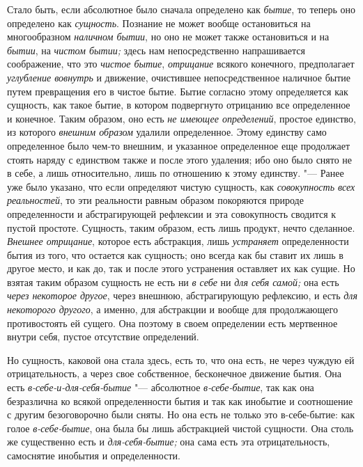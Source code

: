 Стало быть, если абсолютное было сначала определено как
{\em бытие}, то теперь оно определено как
{\em сущность}. Познание не может вообще остановиться
на многообразном {\em наличном бытии}, но оно не может
также остановиться и на {\em бытии}, на
{\em чистом бытии;} здесь нам непосредственно
напрашивается соображение, что это {\em чистое бытие},
{\em отрицание} всякого конечного, предполагает
{\em углубление вовнутрь} и движение, очистившее
непосредственное наличное бытие путем превращения его в чистое бытие. Бытие
согласно этому определяется как сущность, как такое бытие, в котором
подвергнуто отрицанию все определенное и конечное. Таким образом, оно есть
{\em не имеющее определений}, простое единство, из
которого {\em внешним образом} удалили определенное.
Этому единству само определенное было чем-то внешним, и указанное
определенное еще продолжает стоять наряду с единством также и после этого
удаления; ибо оно было снято не в себе, а лишь относительно, лишь по
отношению к этому единству. "--- Ранее
уже было указано, что если определяют чистую сущность, как
{\em совокупность всех реальностей}, то эти реальности
равным образом покоряются природе определенности и абстрагирующей рефлексии
и эта совокупность сводится к пустой простоте. Сущность, таким образом,
есть лишь продукт, нечто сделанное. {\em Внешнее
отрицание}, которое есть абстракция, лишь
{\em устраняет} определенности бытия из того, что
остается как сущность; оно
всегда как бы ставит их лишь в другое место, и как до, так и после этого
устранения оставляет их как сущие. Но взятая таким образом сущность не есть
ни {\em в себе} ни {\em для себя самой;} она есть {\em через некоторое другое},
через внешнюю, абстрагирующую рефлексию, и есть {\em для
некоторого другого}, а именно, для абстракции и вообще для продолжающего
противостоять ей сущего. Она поэтому в своем определении есть мертвенное
внутри себя, пустое отсутствие определений.

Но сущность, каковой она стала здесь, есть то, что она есть, не через чуждую
ей отрицательность, а через свое собственное, бесконечное движение бытия.
Она есть {\em в-себе-и-для-себя-бытие} "--- абсолютное
{\em в-себе-бытие}, так как она безразлична ко всякой
определенности бытия и так как инобытие и соотношение с другим
безоговорочно были сняты. Но она есть не только это в-себе-бытие: как голое
{\em в-себе-бытие}, она была бы лишь абстракцией чистой
сущности. Она столь же существенно есть и
{\em для-себя-бытие;} она сама есть эта
отрицательность, самоснятие инобытия и определенности.

